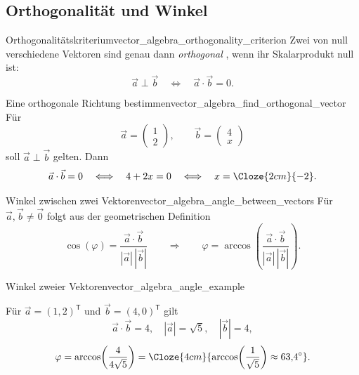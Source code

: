 \subsection{Orthogonalität und Winkel}
\label{subsec:vector_algebra_orthogonality_angles}

\begin{KeyPointBox}{Orthogonalitätskriterium}{vector_algebra_orthogonality_criterion}
  Zwei von null verschiedene Vektoren sind genau dann
  \emph{orthogonal} , wenn ihr Skalarprodukt null ist:
  \[
    \boxed{\vec a\perp\vec b\quad\Longleftrightarrow\quad
      \vec a\cdot\vec b=0}.
  \]
\end{KeyPointBox}

\begin{ExampleBox}{Eine orthogonale Richtung bestimmen}{vector_algebra_find_orthogonal_vector}
  Für
  \[
    \vec a=\begin{pmatrix}1\\2\end{pmatrix},
    \qquad
    \vec b=\begin{pmatrix}4\\x\end{pmatrix}
  \]
  soll $\vec a\perp\vec b$ gelten. Dann
  \[
    \vec a\cdot\vec b=0
    \quad\Longleftrightarrow\quad
    4+2x=0
    \quad\Longleftrightarrow\quad
    x=\Cloze{2cm}{-2}.
  \]
  \begin{center}
  \end{center}
\end{ExampleBox}

\begin{KeyPointBox}{Winkel zwischen zwei Vektoren}{vector_algebra_angle_between_vectors}
  Für $\vec a,\vec b\ne\vec 0$ folgt aus der geometrischen Definition
  \[
    \cos(\varphi)=\frac{\vec a\cdot\vec b}{|\vec a|\,|\vec b|}
    \qquad\Longrightarrow\qquad
    \boxed{
      \varphi=\arccos\!\left(
        \frac{\vec a\cdot\vec b}{|\vec a|\,|\vec b|}
      \right)
    }.
  \]
\end{KeyPointBox}

\begin{ExampleBox}{Winkel zweier Vektoren}{vector_algebra_angle_example}
  \noindent
  \begin{minipage}[c]{0.56\linewidth}
    Für $\vec a=(1,2)^{\mathsf T}$ und
    $\vec b=(4,0)^{\mathsf T}$ gilt
    \[
      \vec a\cdot\vec b=4,
      \quad |\vec a|=\sqrt5,
      \quad |\vec b|=4,
    \]
    \[
      \varphi
      =\arccos\!\left(\frac{4}{4\sqrt5}\right)
      =\Cloze{4cm}{\arccos\!\left(\frac1{\sqrt5}\right)
        \approx63{,}4^\circ}.
    \]
  \end{minipage}\hfill
  \begin{minipage}[c]{0.40\linewidth}
    \centering
  \end{minipage}
\end{ExampleBox}
